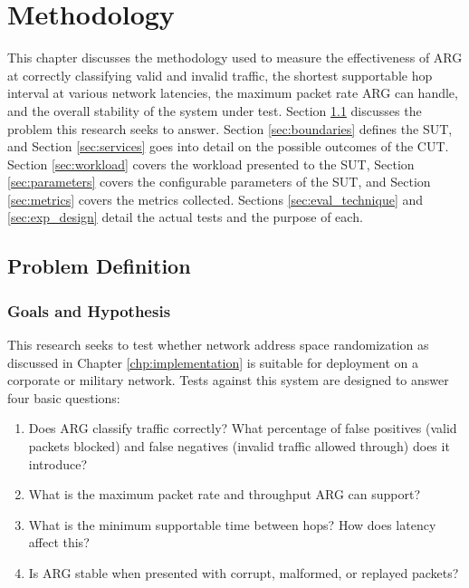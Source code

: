 \chapter{Methodology}
\label{chp:methodology}

\par This chapter discusses the methodology used to measure the effectiveness of \ac{ARG} at correctly classifying valid and invalid traffic, the shortest supportable hop interval at various network latencies, the maximum packet rate \ac{ARG} can handle, and the overall stability of the system under test. Section \ref{sec:problem_def} discusses the problem this research seeks to answer. Section \ref{sec:boundaries} defines the \ac{SUT}, and Section \ref{sec:services} goes into detail on the possible outcomes of the \ac{CUT}. Section \ref{sec:workload} covers the workload presented to the \ac{SUT}, Section \ref{sec:parameters} covers the configurable parameters of the \ac{SUT}, and Section \ref{sec:metrics} covers the metrics collected. Sections \ref{sec:eval_technique} and \ref{sec:exp_design} detail the actual tests and the purpose of each.

\section{Problem Definition}
\label{sec:problem_def}
\subsection{Goals and Hypothesis}
\label{sec:goals}
\par This research seeks to test whether network address space randomization as discussed in Chapter \ref{chp:implementation} is suitable for deployment on a corporate or military network. Tests against this system are designed to answer four basic questions:

\begin{enumerate}
\item Does \ac{ARG} classify traffic correctly? What percentage of false positives (valid packets blocked) and false negatives (invalid traffic allowed through) does it introduce?
\item What is the maximum packet rate and throughput \ac{ARG} can support?
\item What is the minimum supportable time between hops? How does latency affect this?
\item Is \ac{ARG} stable when presented with corrupt, malformed, or replayed packets?
\end{enumerate}


